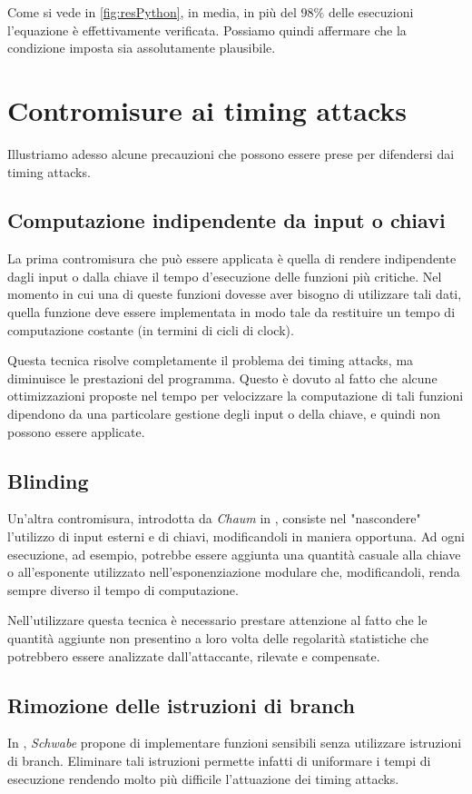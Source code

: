 		Come si vede in \cref{fig:resPython}, in media, in più del $98\%$ delle esecuzioni l'equazione è effettivamente verificata.	Possiamo quindi affermare che la condizione imposta sia assolutamente plausibile. 	 		

	\section{Contromisure ai timing attacks}
	Illustriamo adesso alcune precauzioni che possono essere prese per difendersi dai timing attacks.
	
	\subsection*{Computazione indipendente da input o chiavi}
		La prima contromisura che può essere applicata è quella di rendere indipendente dagli input o dalla chiave il tempo d'esecuzione delle funzioni più critiche. Nel momento in cui una di queste funzioni dovesse aver bisogno di utilizzare tali dati, quella funzione deve essere implementata in modo tale da restituire un tempo di computazione costante (in termini di cicli di clock).
		
		Questa tecnica risolve completamente il problema dei timing attacks, ma diminuisce le prestazioni del programma. Questo è dovuto al fatto che alcune ottimizzazioni proposte nel tempo per velocizzare la computazione di tali funzioni dipendono da una particolare gestione degli input o della chiave, e quindi non possono essere applicate.
		
	\subsection*{Blinding}
		Un'altra contromisura, introdotta da \emph{Chaum} in \cite{chaum1983blind}, consiste nel "nascondere" l'utilizzo di input esterni e di chiavi, modificandoli in maniera opportuna. Ad ogni esecuzione, ad esempio, potrebbe essere aggiunta una quantità casuale alla chiave o all'esponente utilizzato nell'esponenziazione modulare che, modificandoli, renda sempre diverso il tempo di computazione.
		
		Nell'utilizzare questa tecnica è necessario prestare attenzione al fatto che le quantità aggiunte non presentino a loro volta delle regolarità statistiche che potrebbero essere analizzate dall'attaccante, rilevate e compensate.
		
	\subsection*{Rimozione delle istruzioni di branch}
		In \cite{schwabe2016counter}, \emph{Schwabe} propone di implementare funzioni sensibili senza utilizzare istruzioni di branch. Eliminare tali istruzioni permette infatti di uniformare i tempi di esecuzione rendendo molto più difficile l'attuazione dei timing attacks.
		
